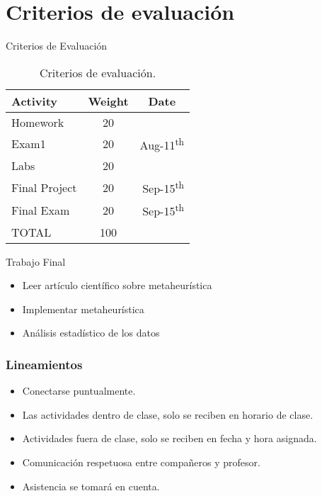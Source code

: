\section{Criterios de evaluación}
\begin{frame}{Criterios de Evaluación}
  
  \begin{table}[h]
    \centering
    \begin{tabular}{lcr}
      \toprule[2pt]
      \textbf{Activity} & \textbf{Weight} & \multicolumn{1}{c}{\textbf{Date}}\\ \midrule
      Homework & 20 & \\
      Exam1 & 20 & Aug-11\textsuperscript{th}  \\
      Labs & 20 &    \\
      \midrule
      Final Project & 20 & Sep-15\textsuperscript{th}   \\
      Final Exam & 20 & Sep-15\textsuperscript{th}   \\
      \midrule
      TOTAL & 100 \\ \bottomrule[1.5pt]
    \end{tabular}
    \caption{Criterios de evaluación.}
    \label{tab:criteriosEvaluacion}
  \end{table}
\end{frame}


\begin{frame}{Trabajo Final}
  \begin{itemize} \parskip3mm \justifying
  \item Leer artículo científico sobre metaheurística
  \item Implementar metaheurística
  \item Análisis estadístico de los datos
  \end{itemize}
\end{frame}

  
\begin{frame}
  \frametitle{Lineamientos}
  \begin{itemize} \justifying \parskip3mm
  \item Conectarse puntualmente.
  \item Las actividades dentro de clase, solo se reciben en horario de clase.
  \item Actividades fuera de clase, solo se reciben en fecha y hora asignada.
  \item Comunicación respetuosa entre compañeros y profesor.
  \item Asistencia se tomará en cuenta.
  \end{itemize}
\end{frame}





